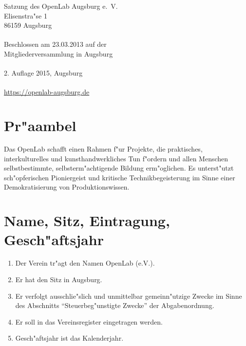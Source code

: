 \documentclass[a5paper, ngerman, 10pt]{scrreprt}
\begin{document}


\thispagestyle{empty}
\vspace*{\fill}
\begin{footnotesize}
    \begin{singlespace}
        \noindent Satzung des OpenLab Augsburg e.~V.\\
        Elisenstra"se 1\\
        86159 Augsburg\\
        \\
        Beschlossen am 23.03.2013 auf der\\
        Mitgliederversammlung in Augsburg\\
        \\
        2. Auflage 2015, Augsburg\\
        \\
        \url{https://openlab-augsburg.de}
    \end{singlespace}
\end{footnotesize}
\clearpage

\tableofcontents
\clearpage


\section*{Pr"aambel}
Das OpenLab schafft einen Rahmen f"ur Projekte, die praktisches,
interkulturelles und kunsthandwerkliches Tun f"ordern und allen Menschen
selbstbestimmte, selbsterm"achtigende Bildung erm"oglichen. Es unterst"utzt
sch"opferischen Pioniergeist und kritische Technikbegeisterung im Sinne einer
Demokratisierung von Produktionswissen.


\section{Name, Sitz, Eintragung, Gesch"aftsjahr}
\begin{enumerate}[(1)]
    \item Der Verein tr"agt den Namen OpenLab (e.V.).
    \item Er hat den Sitz in Augsburg.
    \item Er verfolgt ausschlie"slich und unmittelbar gemeinn"utzige Zwecke im
        Sinne des Abschnitts "`Steuerbeg"unstigte Zwecke"' der Abgabenordnung.
    \item Er soll in das Vereinsregister eingetragen werden.
    \item Gesch"aftsjahr ist das Kalenderjahr.
\end{enumerate}
\end{document}
